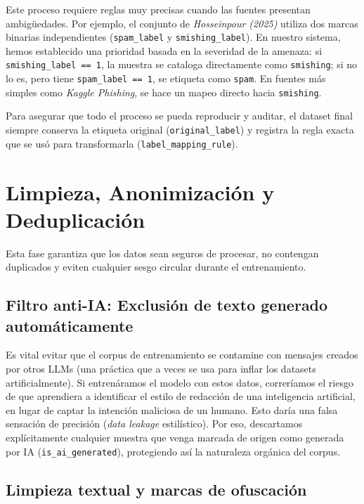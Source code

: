 Este proceso requiere reglas muy precisas cuando las fuentes presentan ambigüedades. Por ejemplo, el conjunto de \textit{Hosseinpour (2025)} utiliza dos marcas binarias independientes (\texttt{spam\_label} y \texttt{smishing\_label}). En nuestro sistema, hemos establecido una prioridad basada en la severidad de la amenaza: si \texttt{smishing\_label == 1}, la muestra se cataloga directamente como \texttt{smishing}; si no lo es, pero tiene \texttt{spam\_label == 1}, se etiqueta como \texttt{spam}. En fuentes más simples como \textit{Kaggle Phishing}, se hace un mapeo directo hacia \texttt{smishing}.

Para asegurar que todo el proceso se pueda reproducir y auditar, el dataset final siempre conserva la etiqueta original (\texttt{original\_label}) y registra la regla exacta que se usó para transformarla (\texttt{label\_mapping\_rule}).

\section{Limpieza, Anonimización y Deduplicación}
\label{sec:limpieza_anonimizacion}

Esta fase garantiza que los datos sean seguros de procesar, no contengan duplicados y eviten cualquier sesgo circular durante el entrenamiento.

\subsection{Filtro anti-IA: Exclusión de texto generado automáticamente}
Es vital evitar que el corpus de entrenamiento se contamine con mensajes creados por otros LLMs (una práctica que a veces se usa para inflar los datasets artificialmente). Si entrenáramos el modelo con estos datos, correríamos el riesgo de que aprendiera a identificar el estilo de redacción de una inteligencia artificial, en lugar de captar la intención maliciosa de un humano. Esto daría una falsa sensación de precisión (\textit{data leakage} estilístico). Por eso, descartamos explícitamente cualquier muestra que venga marcada de origen como generada por IA (\texttt{is\_ai\_generated}), protegiendo así la naturaleza orgánica del corpus.

\subsection{Limpieza textual y marcas de ofuscación}
\label{subsec:limpieza_ofuscacion}

